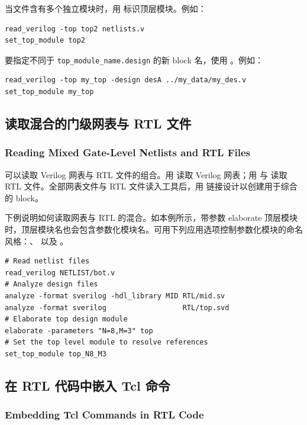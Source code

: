 当文件含有多个独立模块时，用  标识顶层模块。例如：
\begin{lstlisting}
read_verilog -top top2 netlists.v
set_top_module top2
\end{lstlisting}

要指定不同于 \texttt{top\_module\_name.design} 的新 block 名，使用 。例如：
\begin{lstlisting}
read_verilog -top my_top -design desA ../my_data/my_des.v
set_top_module my_top
\end{lstlisting}

\subsection{读取混合的门级网表与 RTL 文件}
\subsubsection*{Reading Mixed Gate-Level Netlists and RTL Files}

可以读取 Verilog 网表与 RTL 文件的组合。用  读取 Verilog 网表；用  与  读取 RTL 文件。全部网表文件与 RTL 文件读入工具后，用  链接设计以创建用于综合的 block。

下例说明如何读取网表与 RTL 的混合。如本例所示，带参数 elaborate 顶层模块时，顶层模块名也会包含参数化模块名。可用下列应用选项控制参数化模块的命名风格：、 以及 。
\begin{lstlisting}
# Read netlist files
read_verilog NETLIST/bot.v
# Analyze design files
analyze -format sverilog -hdl_library MID RTL/mid.sv
analyze -format sverilog                  RTL/top.svd
# Elaborate top design module
elaborate -parameters "N=8,M=3" top
# Set the top level module to resolve references
set_top_module top_N8_M3
\end{lstlisting}

\subsection{在 RTL 代码中嵌入 Tcl 命令}
\subsubsection*{Embedding Tcl Commands in RTL Code}

